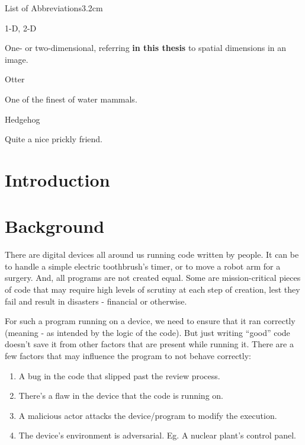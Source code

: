\documentclass[a4paper, nobind]{templates/ociamthesis}
\providecommand{\tightlist}{%
  \setlength{\itemsep}{0pt}\setlength{\parskip}{0pt}}
\begin{document}
\begin{romanpages}
\begin{mclistof}{List of Abbreviations}{3.2cm}
\item[1-D, 2-D]

One- or two-dimensional, referring \textbf{in this thesis} to spatial dimensions in an image.

\item[Otter]

One of the finest of water mammals.

\item[Hedgehog]

Quite a nice prickly friend.

\end{mclistof} 


\end{romanpages}

\flushbottom

\chapter*{Introduction}\label{introduction}

\adjustmtc
{}

\chapter{Background}\label{background}

\minitoc 

There are digital devices all around us running code written by people. It can be
to handle a simple electric toothbrush's timer, or to move a robot arm for a surgery.
And, all programs are not created equal. Some are mission-critical pieces of code that
may require high levels of scrutiny at each step of creation, lest they fail and
result in disasters - financial or otherwise.

For such a program running on a device, we need to ensure that it ran correctly
(meaning - as intended by the logic of the code).
But just writing ``good'' code doesn't save it from other factors that are present while running it.
There are a few factors that may influence the program to not behave correctly:

\begin{enumerate}
\def\labelenumi{\arabic{enumi}.}
\tightlist
\item
  A bug in the code that slipped past the review process.
\item
  There's a flaw in the device that the code is running on.
\item
  A malicious actor attacks the device/program to modify the execution.
\item
  The device's environment is adversarial. Eg. A nuclear plant's control panel.
\end{enumerate}
\end{document}
